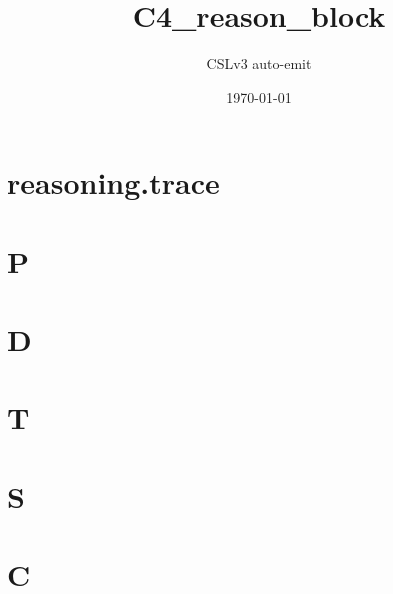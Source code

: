 \documentclass[11pt]{article}
\title{C4\_reason\_block}
\author{CSLv3 auto-emit}
\date{\today}
\begin{document}
\maketitle
\tableofcontents

\section{reasoning.trace}\label{sec:reasoningtrace}
\section{P}\label{sec:p}
\section{D}\label{sec:d}
\section{T}\label{sec:t}
\section{S}\label{sec:s}
\section{C}\label{sec:c}
\end{document}
